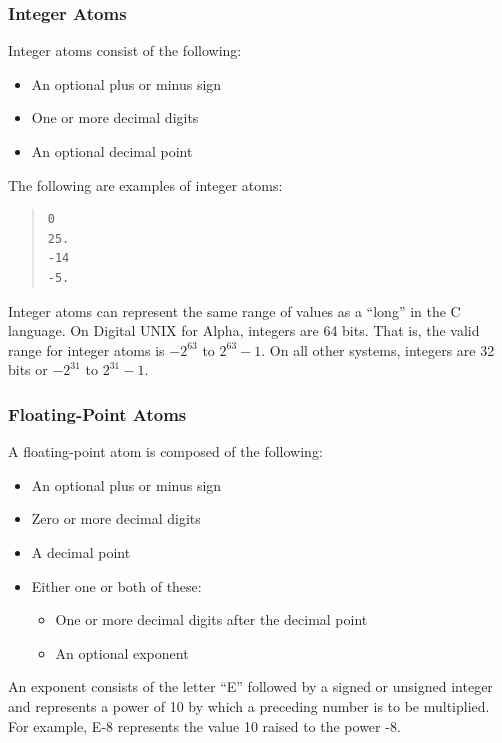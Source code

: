 \subsubsection{Integer Atoms}

Integer atoms consist of the following:

\begin{itemize}
\item An optional plus or minus sign
\item One or more decimal digits
\item An optional decimal point
\end{itemize}

The following are examples of integer atoms:

\begin{quote}
\begin{verbatim}
0
25.
-14
-5.
\end{verbatim}
\end{quote}

Integer atoms can represent the same range of values as a ``long'' in
the C language. On Digital UNIX for Alpha, integers are 64 bits. That
is, the valid range for integer atoms is $-2^{63}$ to $2^{63}- 1$. On
all other systems, integers are 32 bits or $-2^{31}$ to $2^{31}-1$.

\subsubsection{Floating-Point Atoms}

A floating-point atom is composed of the following:

\begin{itemize}
\item An optional plus or minus sign
\item Zero or more decimal digits
\item A decimal point
\item Either one or both of these:
  \begin{itemize}
  \item One or more decimal digits after the decimal point
  \item An optional exponent
  \end{itemize}
\end{itemize}

An exponent consists of the letter ``E'' followed by a signed
or unsigned integer and represents a power of 10 by which a
preceding number is to be multiplied. For example, E-8
represents the value 10 raised to the power -8.


